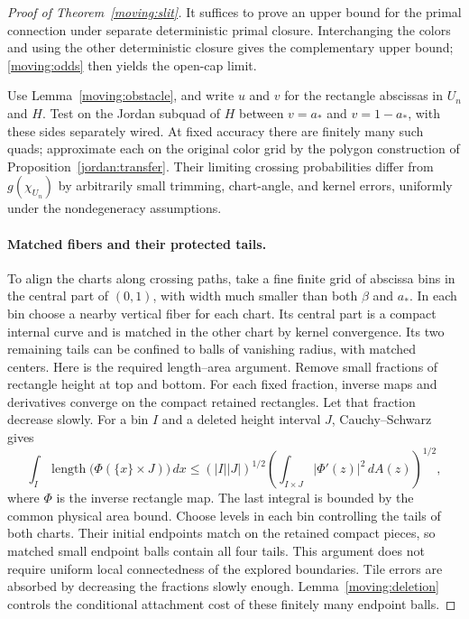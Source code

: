 \begin{proof}[Proof of Theorem~\ref{moving:slit}]
It suffices to prove an upper bound for the primal connection under
separate deterministic primal closure.  Interchanging the colors
and using the other deterministic closure gives the complementary
upper bound; \eqref{moving:odds} then yields the open-cap limit.

Use Lemma~\ref{moving:obstacle}, and write $u$ and $v$ for the rectangle
abscissas in $U_n$ and $H$.  Test on the Jordan subquad of $H$ between
$v=a_*$ and $v=1-a_*$, with these sides separately wired.  At fixed
accuracy there are finitely many such quads; approximate each on the
original color grid by the polygon construction of
Proposition~\ref{jordan:transfer}.  Their limiting crossing
probabilities differ from $g(\chi_{U_n})$ by arbitrarily small
trimming, chart-angle, and kernel errors, uniformly under the
nondegeneracy assumptions.

\paragraph{Matched fibers and their protected tails.}
To align the charts along crossing paths, take a fine finite grid of
abscissa bins in the central part of $(0,1)$, with width much smaller
than both $\beta$ and $a_*$.  In each bin choose a nearby vertical
fiber for each chart.  Its central part is a compact internal curve
and is matched in the other chart by kernel convergence.  Its two
remaining tails can be confined to balls of vanishing radius,
with matched centers.  Here is the required length--area argument.
Remove small fractions of rectangle height at top and bottom.
For each fixed fraction, inverse maps and derivatives converge on
the compact retained rectangles.  Let that fraction decrease slowly.
For a bin $I$ and a deleted height interval $J$, Cauchy--Schwarz gives
\[
 \int_I\!\operatorname{length}\bigl(\Phi(\{x\}\times J)\bigr)\,dx
 \le (|I||J|)^{1/2}
       \left(\int_{I\times J}|\Phi'(z)|^2\,dA(z)\right)^{1/2},
\]
where $\Phi$ is the inverse rectangle map.  The last integral is
bounded by the common physical area bound.  Choose levels in each
bin controlling the tails of both charts.  Their initial endpoints
match on the retained compact pieces, so matched small endpoint
balls contain all four tails.  This argument does not require
uniform local connectedness of the explored boundaries.  Tile errors
are absorbed by decreasing the fractions slowly enough.
Lemma~\ref{moving:deletion} controls the conditional attachment cost
of these finitely many endpoint balls.


\end{proof}
